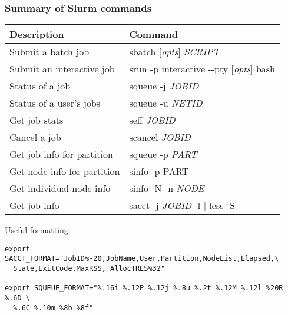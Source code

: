 \documentclass[10pt]{beamer}
\newcommand\smallfont{\fontsize{8pt}{7.2}\selectfont}
\begin{document}
\begin{frame}[fragile]
\frametitle{Summary of Slurm commands}
\begin{tabular}{|l|l|}
\hline
\textbf{Description} & \textbf{Command} \\
\hline
Submit a batch job & sbatch [\textit{opts}] \textit{SCRIPT} \\
\hline
Submit an interactive job & srun -p interactive -{}-pty [\textit{opts}] bash  \\
\hline
Status of a job & squeue -j \textit{JOBID} \\
\hline
Status of a user's jobs & squeue -u \textit{NETID} \\
\hline
Get job stats & seff \textit{JOBID} \\
\hline
Cancel a job & scancel \textit{JOBID} \\
\hline
Get job info for partition & squeue -p \textit{PART} \\
\hline
Get node info for partition & sinfo -p {PART} \\
\hline
Get individual node info & sinfo -N -n \textit{NODE} \\
\hline
Get job info & sacct -j \textit{JOBID} -l | less -S \\
\hline
\end{tabular}

\vspace{0.1in}
Useful formatting:
\smallfont
\begin{verbatim}
export SACCT_FORMAT="JobID%-20,JobName,User,Partition,NodeList,Elapsed,\
  State,ExitCode,MaxRSS, AllocTRES%32"

export SQUEUE_FORMAT="%.16i %.12P %.12j %.8u %.2t %.12M %.12l %20R %.6D \
  %.6C %.10m %8b %8f"
\end{verbatim}

\end{frame}
\end{document}
